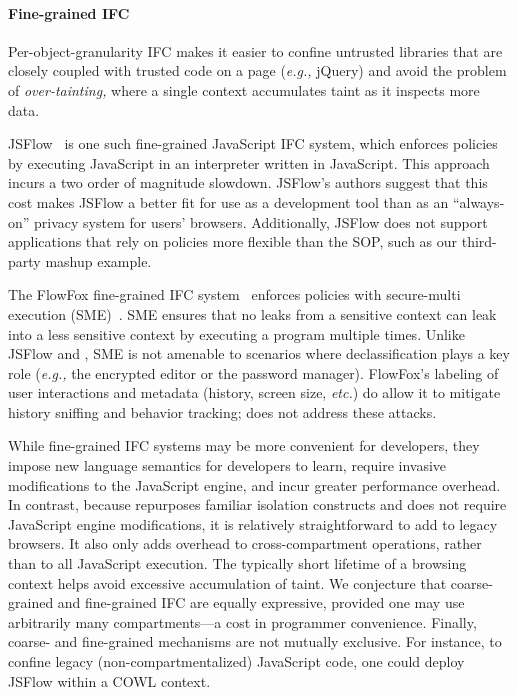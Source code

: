 \paragraph{Fine-grained IFC}
Per-object-granularity IFC makes
it easier to confine untrusted libraries that are closely coupled with trusted
code on a page (\emph{e.g.,} jQuery) and avoid the problem of
\emph{over-tainting,}
where a single context accumulates taint as it inspects more data.

JSFlow~\cite{JSFlow} is one such fine-grained JavaScript IFC system, which
enforces policies by executing JavaScript in an interpreter written in
JavaScript.
%
This approach incurs a two order of magnitude slowdown. JSFlow's
authors suggest that this cost makes JSFlow a better fit for use as a
development tool than as an ``always-on'' privacy system for users'
browsers.
%
Additionally, JSFlow does not support applications that rely on policies
more flexible than the SOP, such as our third-party mashup example.

The FlowFox fine-grained IFC system~\cite{DeGroef:2012} enforces
policies with secure-multi execution (SME)~\cite{Devriese:2010}. SME
ensures that no leaks from a sensitive context can leak into a less
sensitive context by executing a program multiple times.
%
Unlike JSFlow and \sys{}, SME is not amenable to
scenarios where declassification plays a key role (\emph{e.g.,} the encrypted
editor or the password manager).
%
FlowFox's labeling of user interactions and metadata (history, screen
size, \emph{etc.}) do allow it to mitigate history sniffing and
behavior tracking; \sys{} does not address these attacks.

While fine-grained IFC systems may be more convenient for developers,
they impose new language semantics for developers to learn, require
invasive modifications to the JavaScript engine, and incur greater
performance overhead.
%
In contrast, because \sys{} repurposes familiar isolation constructs
and does not require JavaScript engine modifications, it is relatively
straightforward to add to legacy browsers. It also only adds overhead
to cross-compartment operations, rather than to all JavaScript
execution. The typically short lifetime of a browsing context helps
avoid excessive accumulation of taint.
%
We conjecture that coarse-grained and fine-grained IFC are equally
expressive, provided one may use arbitrarily many compartments---a
cost in programmer convenience.
%
Finally, coarse- and fine-grained mechanisms are not mutually
exclusive. For instance, to confine legacy (non-compartmentalized)
JavaScript code, one could deploy JSFlow within a COWL context.

